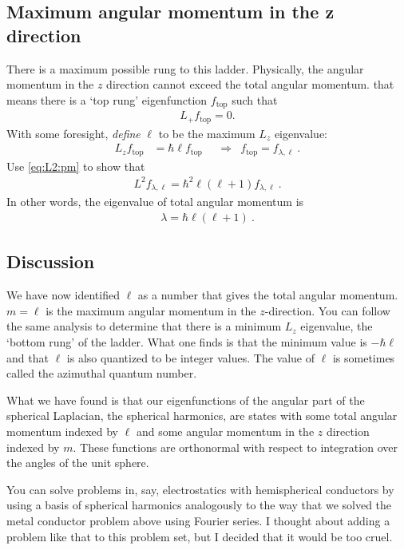 \documentclass[12pt]{article}
\numberwithin{equation}{section}    %
\begin{document}
\subsection{Maximum angular momentum in the z direction}

There is a maximum possible rung to this ladder. Physically, the angular momentum in the $z$ direction cannot exceed the total angular momentum. that means there is a `top rung' eigenfunction $f_\text{top}$ such that
\begin{align}
	L_+ f_\text{top} = 0. 
\end{align}
With some foresight, \emph{define} $\ell$ to be the maximum $L_z$ eigenvalue:
\begin{align}
	L_z f_\text{top} &= \hbar \ell f_\text{top}
	&
	&\Rightarrow &
	f_\text{top} =  f_{\lambda,\ell}
	 \ . 
\end{align}
Use \eqref{eq:L2:pm} to show that
\begin{align}
	L^2 f_{\lambda,\ell} = \hbar^2 \ell(\ell+1) f_{\lambda,\ell} \ .
\end{align}
In other words, the eigenvalue of total angular momentum is
\begin{align}
	\lambda = \hbar\ell(\ell+1) \ .
\end{align}

\subsection*{Discussion}
We have now identified $\ell$ as a number that gives the total angular momentum. $m=\ell$ is the maximum angular momentum in the $z$-direction. You can follow the same analysis to determine that there is a minimum $L_z$ eigenvalue, the `bottom rung' of the ladder. What one finds is that the minimum value is $-\hbar \ell$ and that $\ell$ is also quantized to be integer values. The value of $\ell$ is sometimes called the azimuthal quantum number. 

What we have found is that our eigenfunctions of the angular part of the spherical Laplacian, the spherical harmonics, are states with some total angular momentum indexed by $\ell$ and some angular momentum in the $z$ direction indexed by $m$. These functions are orthonormal with respect to integration over the angles of the unit sphere. 

You can solve problems in, say, electrostatics with hemispherical conductors by using a basis of spherical harmonics analogously to the way that we solved the metal conductor problem above using Fourier series. I thought about adding a problem like that to this problem set, but I decided that it would be too cruel.
\end{document}
